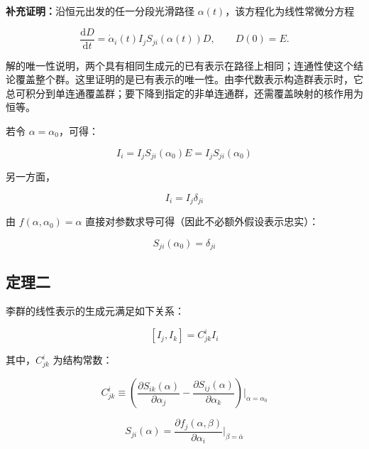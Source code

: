 \textbf{补充证明：}沿恒元出发的任一分段光滑路径 $\alpha\left(t\right)$，该方程化为线性常微分方程

\begin{equation}
\frac{\mathrm{d}D}{\mathrm{d}t}=\dot\alpha_i\left(t\right)I_j S_{ji}\left(\alpha\left(t\right)\right)D,\qquad D\left(0\right)=E.
\end{equation}

解的唯一性说明，两个具有相同生成元的已有表示在路径上相同；连通性使这个结论覆盖整个群。这里证明的是已有表示的唯一性。由李代数表示构造群表示时，它总可积分到单连通覆盖群；要下降到指定的非单连通群，还需覆盖映射的核作用为恒等。

若令 $\alpha=\alpha_0$，可得：

\begin{equation}
I_i
=I_j S_{ji}\left(\alpha_0\right) E 
=I_j S_{ji}\left(\alpha_0\right)
\end{equation}

另一方面，

\begin{equation}
I_{i}
=I_{j}\delta_{ji}
\end{equation}

由 $f\left(\alpha,\alpha_0\right)=\alpha$ 直接对参数求导可得（因此不必额外假设表示忠实）：

\begin{equation}
S_{ji}\left(\alpha_0\right)
=\delta_{ji}
\end{equation}

\subsection{定理二}

李群的线性表示的生成元满足如下关系：

\begin{equation}
\left[I_j,I_k\right]
=C_{jk}^i I_i
\end{equation}

其中，$C_{jk}^i$ 为结构常数：

\begin{equation}
C_{jk}^i
\equiv \left(\frac{\partial S_{ik}\left(\alpha\right) }{\partial \alpha_j } - \frac{\partial S_{ij}\left(\alpha\right) }{\partial\alpha_k }  \right)\bigg|_{\alpha=\alpha_0}
\end{equation}

\begin{equation}
S_{ji}\left(\alpha\right)
=\frac{\partial f_j\left(\alpha,\beta\right) }{\partial \alpha_i }\bigg|_{\beta=\bar{\alpha}}
\end{equation}

